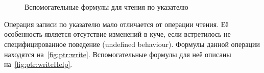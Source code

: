 \begin{figure}[H]
\centering
\tiny
\setlength{\jot}{1pt}
\begin{mymathbox}
 \\
 \\
 \\
 \\
 \\
 \\
 \\
\end{mymathbox}
\normalsize
\caption{Вспомогательные формулы для чтения по указателю} \label{fig:ptr:readHelp}
\end{figure}

Операция записи по указателю мало отличается от операции чтения. Её особенность является отсутствие изменений в куче, если встретилось не специфицированное поведение (undefined behaviour). Формулы данной операции находятся на~\autoref{fig:ptr:write}. Вспомогательные формулы для неё описаны на~\autoref{fig:ptr:writeHelp}.

